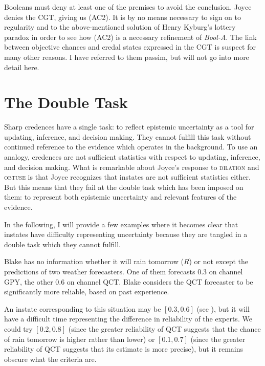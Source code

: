 \documentclass[11pt]{article}
\newcommand{\anderson}[0]{\textit{Bool-A}}
\begin{document}
Booleans must deny at least one of the premises to avoid the
conclusion. Joyce denies the CGT, giving us (AC2). It is by no means
necessary to sign on to regularity and to the above-mentioned solution
of Henry Kyburg's lottery paradox in order to see how (AC2) is a
necessary refinement of {\anderson}. The link between objective
chances and credal states expressed in the CGT is suspect for many
other reasons. I have referred to them passim, but will not go into
more detail here.

\section{The Double Task}
\label{TheDoubleTask}

Sharp credences have a single task: to reflect epistemic uncertainty
as a tool for updating, inference, and decision making. They cannot
fulfill this task without continued reference to the evidence which
operates in the background. To use an analogy, credences are not
sufficient statistics with respect to updating, inference, and
decision making. What is remarkable about Joyce's response to
\textsc{dilation} and \textsc{obtuse} is that Joyce recognizes that
instates are not sufficient statistics either. But this means that
they fail at the double task which has been imposed on them: to
represent both epistemic uncertainty and relevant features of the
evidence.

In the following, I will provide a few examples where it becomes clear
that instates have difficulty representing uncertainty because they
are tangled in a double task which they cannot fulfill.

\begin{quotex}
  \label{ex:aggreg} Blake has no
  information whether it will rain tomorrow ($R$) or not except the
  predictions of two weather forecasters. One of them forecasts 0.3 on
  channel GPY, the other 0.6 on channel QCT. Blake considers the QCT
  forecaster to be significantly more reliable, based on past
  experience.
\end{quotex}

An instate corresponding to this situation may be $[0.3,0.6]$ (see
), but it will have a difficult time
representing the difference in reliability of the experts. We could
try $[0.2,0.8]$ (since the greater reliability of QCT suggests that
the chance of rain tomorrow is higher rather than lower) or
$[0.1,0.7]$ (since the greater reliability of QCT suggests that its
estimate is more precise), but it remains obscure what the criteria
are.
\end{document}
